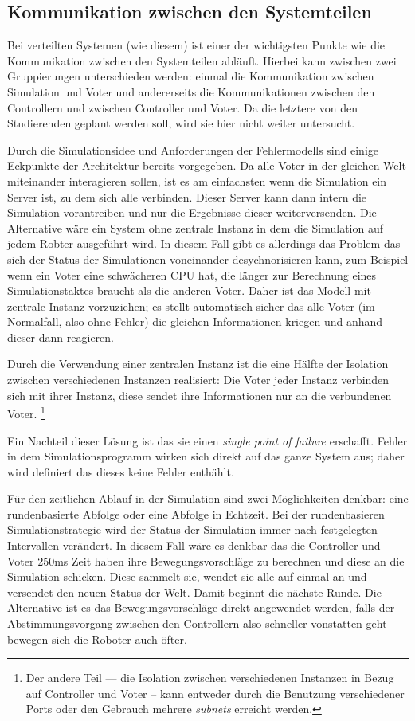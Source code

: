 \subsection{Kommunikation zwischen den Systemteilen}
Bei verteilten Systemen (wie diesem) ist einer der wichtigsten Punkte wie die Kommunikation zwischen den Systemteilen abl{\"{a}}uft.
Hierbei kann zwischen zwei Gruppierungen unterschieden werden: einmal die Kommunikation zwischen Simulation und Voter und andererseits
die Kommunikationen zwischen den Controllern und zwischen Controller und Voter. Da die letztere von den Studierenden geplant werden soll,
wird sie hier nicht weiter untersucht.

Durch die Simulationsidee und Anforderungen der Fehlermodells sind einige Eckpunkte der Architektur bereits vorgegeben. Da alle Voter
in der gleichen Welt miteinander interagieren sollen, ist es am einfachsten wenn die Simulation ein Server ist, zu dem sich alle
verbinden. Dieser Server kann dann intern die Simulation vorantreiben und nur die Ergebnisse dieser weiterversenden. Die Alternative
w{\"{a}}re ein System ohne zentrale Instanz in dem die Simulation auf jedem Robter ausgef{\"{u}}hrt wird. In diesem Fall gibt es
allerdings das Problem das sich der Status der Simulationen voneinander desychnorisieren kann, zum Beispiel wenn ein Voter
eine schw{\"{a}}cheren CPU hat, die l{\"{a}}nger zur Berechnung eines Simulationstaktes braucht als die anderen Voter. Daher ist
das Modell mit zentrale Instanz vorzuziehen; es stellt automatisch sicher das alle Voter (im Normalfall, also ohne Fehler)
die gleichen Informationen kriegen und anhand dieser dann reagieren.

Durch die Verwendung einer zentralen Instanz ist die eine H{\"{a}}lfte der Isolation zwischen verschiedenen Instanzen realisiert:
Die Voter jeder Instanz verbinden sich mit ihrer Instanz, diese sendet ihre Informationen nur an die verbundenen Voter.
\footnote{Der andere Teil --- die Isolation zwischen verschiedenen Instanzen in Bezug auf Controller und Voter -- kann entweder
durch die Benutzung verschiedener Ports oder den Gebrauch mehrere \textit{subnets} erreicht werden.}

Ein Nachteil dieser L{\"{o}}sung ist das sie einen \textit{single point of failure} erschafft. Fehler in dem Simulationsprogramm
wirken sich direkt auf das ganze System aus; daher wird definiert das dieses keine Fehler enth{\"{a}}hlt.

F{\"{u}}r den zeitlichen Ablauf in der Simulation sind zwei M{\"{o}}glichkeiten denkbar: eine rundenbasierte Abfolge oder eine
Abfolge in Echtzeit. Bei der rundenbasieren Simulationstrategie wird der Status der Simulation immer nach festgelegten Intervallen
ver{\"{a}}ndert. In diesem Fall w{\"{a}}re es denkbar das die Controller und Voter 250ms Zeit haben ihre Bewegungsvorschl{\"{a}}ge
zu berechnen und diese an die Simulation schicken. Diese sammelt sie, wendet sie alle auf einmal an und versendet den neuen Status der
Welt. Damit beginnt die n{\"{a}}chste Runde. Die Alternative ist es das Bewegungsvorschl{\"{a}}ge direkt angewendet werden, falls
der Abstimmungsvorgang zwischen den Controllern also schneller vonstatten geht bewegen sich die Roboter auch {\"{o}}fter.

